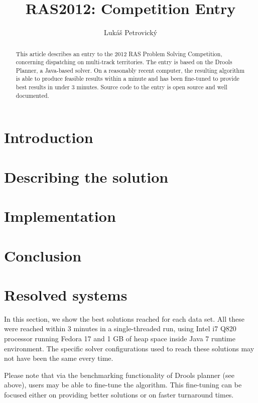 \documentclass[10pt,a4paper,draft]{article}
\author{Lukáš Petrovický}
\title{RAS2012: Competition Entry}
\begin{document}
\maketitle

\begin{abstract}
This article describes an entry to the 2012 RAS Problem Solving Competition, concerning dispatching on multi-track territories. The entry is based on the Drools Planner, a Java-based solver. On a reasonably recent computer, the resulting algorithm is able to produce feasible results within a minute and has been fine-tuned to provide best results in under 3 minutes. Source code to the entry is open source and well documented.
\end{abstract}

\section{Introduction}

\section{Describing the solution}

\section{Implementation}

\section{Conclusion}

\appendix

\section{Resolved systems}

In this section, we show the best solutions reached for each data set. All these were reached within 3 minutes in a single-threaded run, using Intel i7 Q820 processor running Fedora 17 and 1 GB of heap space inside Java 7 runtime environment. The specific solver configurations used to reach these solutions may not have been the same every time.

Please note that via the benchmarking functionality of Drools planner (see above), users may be able to fine-tune the algorithm. This fine-tuning can be focused either on providing better solutions or on faster turnaround times.
\end{document}
